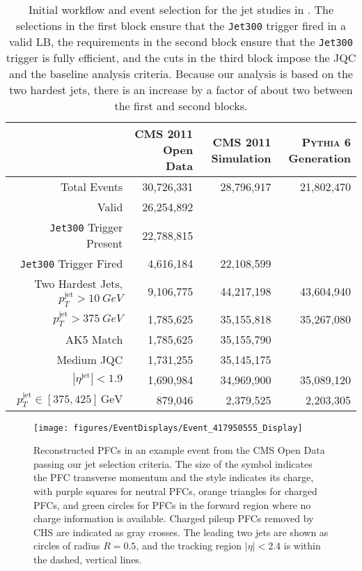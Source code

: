 \documentclass[aps,prd,twocolumn,preprintnumbers,nofootinbib,longbibliography,floatfix,superscriptaddress]{revtex4-1}
\begin{document}
\begin{table*}[p]
\begin{center}
\begin{tabular}{r @{$\quad$}  r   @{$\quad$} r @{$\quad$} r}
\hline
\hline
& CMS 2011 Open Data & CMS 2011 Simulation& \textsc{Pythia} 6 Generation\\
\hline
\hline
Total Events & 30,726,331  & 28,796,917 & 21,802,470 \\
Valid & 26,254,892  &  &   \\
\texttt{Jet300} Trigger Present & 22,788,815 &  &  \\
\texttt{Jet300} Trigger Fired & 4,616,184 & 22,108,599 & \\
\hline
Two Hardest Jets, $p_T^\text{jet}>\SI{10}{GeV}$ &9,106,775 & 44,217,198 & 43,604,940 \\
 $p_T^\text{jet} > \SI{375}{GeV}$  & 1,785,625 & 35,155,818 & 35,267,080 \\
AK5 Match  & 1,785,625 &  35,155,790 & \\
\hline
Medium JQC  & 1,731,255 & 35,145,175 & \\
 $|\eta^\text{jet}| < 1.9$  & 1,690,984 & 34,969,900 & 35,089,120  \\
 $p_T^\text{jet} \in [375,425]\,\text{GeV}$  & 879,046 & 2,379,525& 2,203,305  \\
\hline
\hline
\end{tabular}
\caption{
Initial workflow and event selection for the jet studies in .
%
The selections in the first block ensure that the \texttt{Jet300} trigger fired in a valid LB, the requirements in the second block ensure that the \texttt{Jet300} trigger is fully efficient, and the cuts in the third block impose the JQC and the baseline analysis criteria.
%
Because our analysis is based on the two hardest jets, there is an increase by a factor of about two between the first and second blocks.
}
\label{tab:workflow}
\end{center}
\end{table*}


\begin{figure*}[p]
\centering
\texttt{[image: figures/EventDisplays/Event\_417950555\_Display]}
\caption{\label{fig:eventdisplay}
%
Reconstructed PFCs in an example event from the CMS Open Data passing our jet selection criteria.
%
The size of the symbol indicates the PFC transverse momentum and the style indicates its charge, with purple squares for neutral PFCs, orange triangles for charged PFCs, and green circles for PFCs in the forward region where no charge information is available.
%
Charged pileup PFCs removed by CHS are indicated as gray crosses.
%
The leading two jets are shown as circles of radius $R = 0.5$, and the tracking region $|\eta|<2.4$ is within the dashed, vertical lines.
%
}
\end{figure*}
\end{document}
